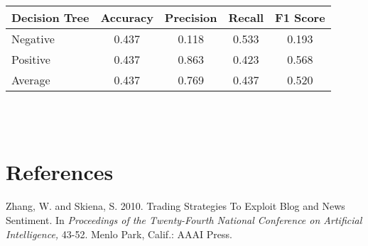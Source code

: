\documentclass[letterpaper]{article}
\begin{document}
{\noindent\begin{tabular}{C{2cm} | c c c c}
\textbf{Decision Tree}   & Accuracy  & Precision & Recall    & F1 Score  \\
\hline
Negative        & 0.437     & 0.118     & 0.533     & 0.193     \\
Positive        & 0.437     & 0.863     & 0.423     & 0.568     \\
Average         & 0.437     & 0.769     & 0.437     & 0.520     \\
\end{tabular} \\ \\
}
\section{References}

\smallskip \noindent Zhang, W. and Skiena, S. 2010. Trading Strategies To Exploit Blog and News Sentiment. In \textit{Proceedings of the Twenty-Fourth National Conference on Artificial Intelligence,} 43-52. Menlo Park, Calif.: AAAI Press. 
\end{document}
